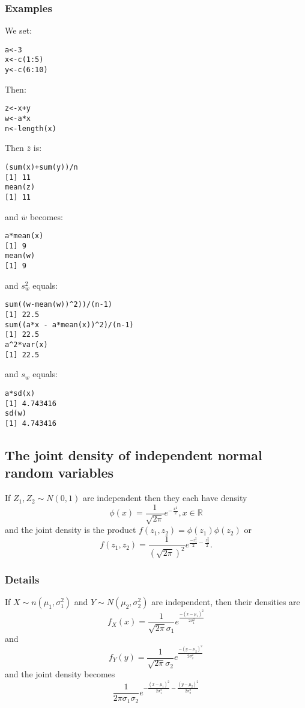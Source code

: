 \documentclass[12pt,a4paper]{article}
\theoremstyle{regla}
\theoremstyle{remark}
\theoremstyle{definition}
\theoremstyle{nonumberbreak}
\begin{document}
\subsubsection{Examples}
\begin{xmpl}
We set:
\begin{lstlisting}
a<-3
x<-c(1:5)
y<-c(6:10)
\end{lstlisting}

Then:
\begin{lstlisting}
z<-x+y
w<-a*x
n<-length(x)
\end{lstlisting}

Then $\overline{z}$ is:
\begin{lstlisting}
(sum(x)+sum(y))/n 
[1] 11
mean(z) 
[1] 11
\end{lstlisting}

and $\overline{w}$ becomes:
\begin{lstlisting}
a*mean(x)
[1] 9
mean(w)
[1] 9
\end{lstlisting}

and $s_w^2$ equals:
\begin{lstlisting}
sum((w-mean(w))^2))/(n-1)
[1] 22.5
sum((a*x - a*mean(x))^2)/(n-1)
[1] 22.5
a^2*var(x)
[1] 22.5
\end{lstlisting}

and $s_w$ equals:
\begin{lstlisting}
a*sd(x)
[1] 4.743416
sd(w)
[1] 4.743416
\end{lstlisting}
\end{xmpl}

\subsection{The joint density of independent normal random variables}
\begin{fbox}
\begin{minipage}{0.97\textwidth}
If $Z_1, Z_2 \sim N(0,1)$ are independent then they each have density\\
$$\phi(x)=\frac{1}{\sqrt{2\pi}}e^{-\frac{x^2}{2}},x\in\mathbb{R}$$
and the joint density is the product $f(z_1,z_2)=\phi(z_1)\phi(z_2)$ or
$$f(z_1,z_2)=\frac{1}{(\sqrt{2\pi})^2} e^{\frac{-z_1^2}{2}-\frac{z_2^2}{2}} .$$
\end{minipage}
\end{fbox}
\subsubsection{Details}
If $X\sim n (\mu_1,\sigma_1^2)$ and $Y\sim N(\mu_2, \sigma_2^2)$ are independent, then their densities are
$$
f_X (x)= \frac{1}{\sqrt{2\pi}\sigma_1} e^\frac{-(x-\mu_1)^2}{2\sigma_1^2}$$ 
and
$$
f_Y(y) = \frac{1}{\sqrt{2\pi}\sigma_2} e^\frac{-(y-\mu_2)^2}{2\sigma_2^2}$$ 
and the joint density becomes\\
$$\frac{1}{2\pi\sigma_1\sigma_2} e^{-\frac{(x-\mu_1)^2}{2\sigma_1^2}-\frac{(y-\mu_2)^2}{2\sigma_2^2}}$$
\end{document}
